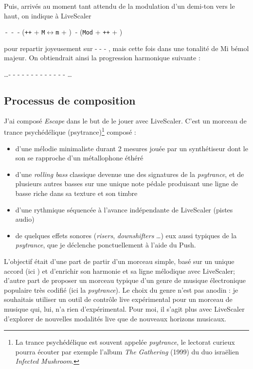 \documentclass{article}
\newcommand{\LSMod}{\texttt{Mod} }
\newcommand{\LSpp}{\texttt{++} }
\newcommand{\LSI}{\writechord{I}}
\newcommand{\LSIV}{\writechord{IV}}
\newcommand{\LSV}{\writechord{V}}
\newcommand{\LSvi}{\writechord{vi}}
\newcommand{\LSMm}{\texttt{M}$\leftrightarrow$\texttt{m} }
\begin{document}
Puis, arrivés au moment tant attendu de la modulation d'un demi-ton vers le haut, on indique à LiveScaler

\begin{center}
  \LSI $~$-  \LSIV $~$-  \LSV $~$-  (\LSpp + \LSMm +  \LSvi) $~$-  (\LSMod + \LSpp + \LSI)
\end{center}

\noindent pour repartir joyeusement sur \LSI - \LSIV - \LSV - \LSIV, mais cette fois dans une tonalité de Mi bémol majeur. On obtiendrait ainsi la progression harmonique suivante :

\begin{center}
  \dots \hspace{4pt}-  -  -  -  -  -  -  -  -  -   -  -  - \dots
\end{center}


\subsection{Processus de composition}

J'ai composé \emph{Escape} dans le but de le jouer avec LiveScaler. C'est un morceau de trance psychédélique (psytrance)\footnote{La trance psychédélique est souvent  appelée \emph{psytrance}, le lectorat curieux pourra écouter par exemple l'album \emph{The Gathering} (1999) du duo israëlien \emph{Infected Mushroom}.} composé  :
\begin{itemize}
  \item d'une mélodie minimaliste durant 2 mesures jouée par un synthétiseur  dont le son se rapproche d'un métallophone éthéré
  \item d'une \emph{rolling bass} classique devenue une des signatures de la \emph{psytrance}, et de plusieurs autres basses sur une unique note pédale produisant une ligne de basse riche dans sa texture et son timbre
  \item d'une rythmique séquencée à l'avance indépendante de LiveScaler (pistes audio)
  \item de quelques effets sonores (\emph{risers}, \emph{downshifters} \dots) eux aussi typiques de la \emph{psytrance}, que je déclenche ponctuellement à l'aide du Push.
\end{itemize}

L'objectif était d'une part de partir d'un morceau simple, basé sur un unique accord (ici ) et d'enrichir son harmonie et sa ligne mélodique avec LiveScaler; d'autre part de proposer un morceau typique d'un genre de musique électronique populaire très codifié (ici la \emph{psytrance}). Le choix du genre n'est pas anodin :  je souhaitais utiliser un outil de contrôle live expérimental pour un morceau de musique qui, lui, n'a rien d'expérimental. Pour moi, il s'agit plus avec LiveScaler d'explorer de nouvelles modalités live que de nouveaux horizons musicaux.
\end{document}
